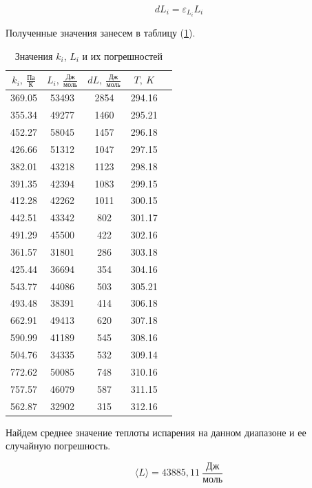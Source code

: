 \documentclass[a4paper,12pt]{article} %
\begin{document}
\begin{equation}
  dL_i = \varepsilon_{L_i} L_i
\end{equation}

Полученные значения занесем в таблицу (\ref{tab:k_i_L}).

\begin{table}[h]
  \centering
  \begin{tabular}{|c|c|c|c|c|}
    \hline
    $k_i,\ \frac{\text{Па}}{\text{К}}$ & $L_i,\ \frac{\text{Дж}}{\text{моль}}$ & $dL,\ \frac{\text{Дж}}{\text{моль}}$ & $T,\ K$ \\
    \hline
    369.05 & 53493 & 2854 & 294.16 \\
    355.34 & 49277 & 1460 & 295.21 \\
    452.27 & 58045 & 1457 & 296.18 \\
    426.66 & 51312 & 1047 & 297.15 \\
    382.01 & 43218 & 1123 & 298.18 \\
    391.35 & 42394 & 1083 & 299.15 \\
    412.28 & 42262 & 1011 & 300.15 \\
    442.51 & 43342 & 802  & 301.17 \\
    491.29 & 45500 & 422  & 302.16 \\
    361.57 & 31801 & 286  & 303.18 \\
    425.44 & 36694 & 354  & 304.16 \\
    543.77 & 44086 & 503  & 305.21 \\
    493.48 & 38391 & 414  & 306.18 \\
    662.91 & 49413 & 620  & 307.18 \\
    590.99 & 41189 & 545  & 308.16 \\
    504.76 & 34335 & 532  & 309.14 \\
    772.62 & 50085 & 748  & 310.16 \\
    757.57 & 46079 & 587  & 311.15 \\
    562.87 & 32902 & 315  & 312.16 \\
    \hline
  \end{tabular}
    \caption{Значения $k_i$, $L_i$ и их погрешностей}
    \label{tab:k_i_L}
\end{table}

Найдем среднее значение теплоты испарения на данном диапазоне и ее случайную погрешность.

\begin{equation}
  \langle L \rangle = 43885,11\ \frac{\mbox{Дж}}{\mbox{моль}} 
\end{equation}
\end{document}
